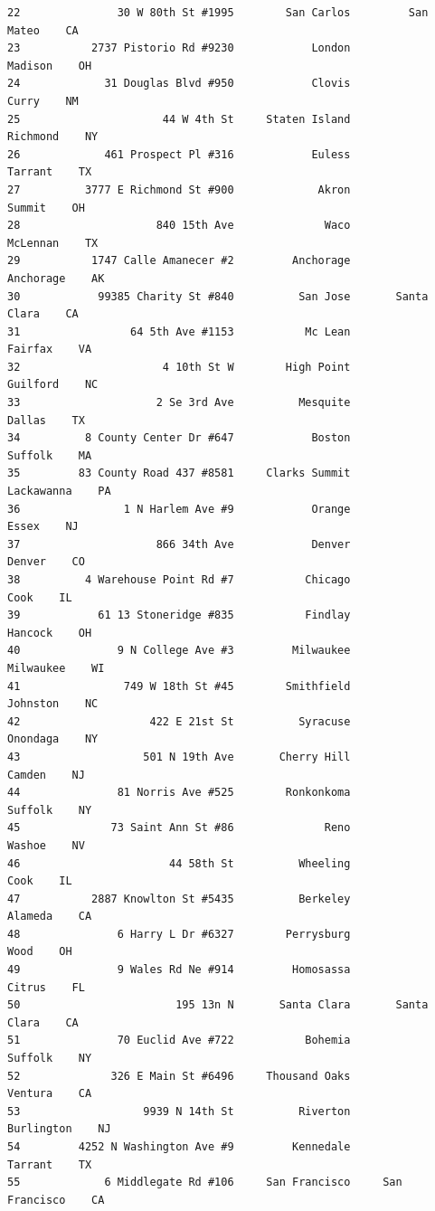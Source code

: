 \documentclass[
  12pt,
]{article}
\begin{document}
\begin{verbatim}
22               30 W 80th St #1995        San Carlos         San Mateo    CA
23           2737 Pistorio Rd #9230            London           Madison    OH
24             31 Douglas Blvd #950            Clovis             Curry    NM
25                      44 W 4th St     Staten Island          Richmond    NY
26             461 Prospect Pl #316            Euless           Tarrant    TX
27          3777 E Richmond St #900             Akron            Summit    OH
28                     840 15th Ave              Waco          McLennan    TX
29           1747 Calle Amanecer #2         Anchorage         Anchorage    AK
30            99385 Charity St #840          San Jose       Santa Clara    CA
31                 64 5th Ave #1153           Mc Lean           Fairfax    VA
32                      4 10th St W        High Point          Guilford    NC
33                     2 Se 3rd Ave          Mesquite            Dallas    TX
34          8 County Center Dr #647            Boston           Suffolk    MA
35         83 County Road 437 #8581     Clarks Summit        Lackawanna    PA
36                1 N Harlem Ave #9            Orange             Essex    NJ
37                     866 34th Ave            Denver            Denver    CO
38          4 Warehouse Point Rd #7           Chicago              Cook    IL
39            61 13 Stoneridge #835           Findlay           Hancock    OH
40               9 N College Ave #3         Milwaukee         Milwaukee    WI
41                749 W 18th St #45        Smithfield          Johnston    NC
42                    422 E 21st St          Syracuse          Onondaga    NY
43                   501 N 19th Ave       Cherry Hill            Camden    NJ
44               81 Norris Ave #525        Ronkonkoma           Suffolk    NY
45              73 Saint Ann St #86              Reno            Washoe    NV
46                       44 58th St          Wheeling              Cook    IL
47           2887 Knowlton St #5435          Berkeley           Alameda    CA
48               6 Harry L Dr #6327        Perrysburg              Wood    OH
49               9 Wales Rd Ne #914         Homosassa            Citrus    FL
50                        195 13n N       Santa Clara       Santa Clara    CA
51               70 Euclid Ave #722           Bohemia           Suffolk    NY
52              326 E Main St #6496     Thousand Oaks           Ventura    CA
53                   9939 N 14th St          Riverton        Burlington    NJ
54         4252 N Washington Ave #9         Kennedale           Tarrant    TX
55             6 Middlegate Rd #106     San Francisco     San Francisco    CA

\end{verbatim}
\end{document}
